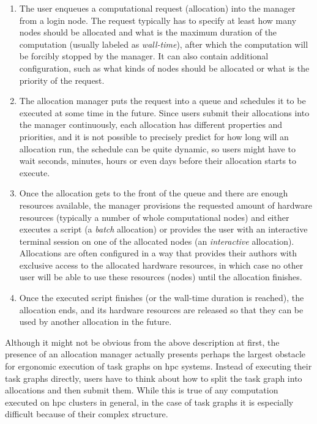 \begin{enumerate}
	\item The user enqueues a computational request (allocation) into the manager from a login node. The
	      request typically has to specify at least how many nodes should be allocated and what is the
	      maximum duration of the computation (usually labeled as \emph{wall-time}), after which the
	      computation will be forcibly stopped by the manager. It can also contain additional configuration,
	      such as what kinds of nodes should be allocated or what is the priority of the request.
	\item The allocation manager puts the request into a queue and schedules it to be executed at some time
	      in the future. Since users submit their allocations into the manager continuously, each allocation
	      has different properties and priorities, and it is not possible to precisely predict for how long
	      will an allocation run, the schedule can be quite dynamic, so users might have to wait seconds,
	      minutes, hours or even days before their allocation starts to execute.
	\item Once the allocation gets to the front of the queue and there are enough resources available, the
	      manager provisions the requested amount of hardware resources (typically a number of whole
	      computational nodes) and either executes a script (a \emph{batch} allocation) or
	      provides the user with an interactive terminal session on one of the allocated nodes (an
	      \emph{interactive} allocation). Allocations are often configured in a way that provides
	      their authors with exclusive access to the allocated hardware resources, in which case no other
	      user will be able to use these resources (nodes) until the allocation finishes.
	\item Once the executed script finishes (or the wall-time duration is reached), the allocation ends, and
	      its hardware resources are released so that they can be used by another allocation in the future.
\end{enumerate}

Although it might not be obvious from the above description at first, the presence of an allocation
manager actually presents perhaps the largest obstacle for ergonomic execution of task graphs on
\gls{hpc} systems. Instead of executing their task graphs directly, users have to
think about how to split the task graph into allocations and then submit them. While this is true
of any computation executed on \gls{hpc} clusters in general, in the case of task
graphs it is especially difficult because of their complex structure.

